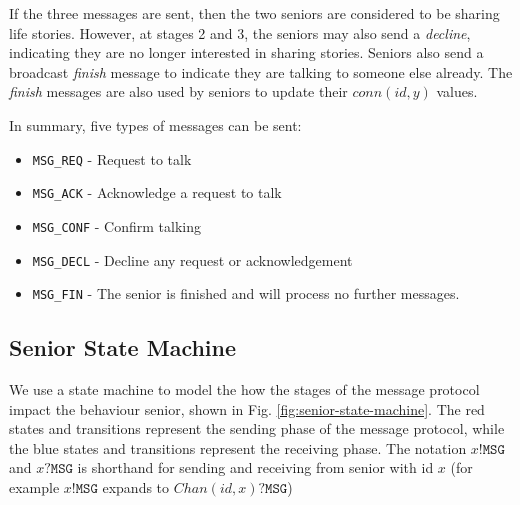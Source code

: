 \documentclass[12pt,a4paper]{scrartcl}
\begin{document}
If the three messages are sent, then the two seniors are considered to be sharing life stories.
However, at stages 2 and 3, the seniors may also send a \emph{decline}, indicating they are no longer interested in sharing stories.
Seniors also send a broadcast \emph{finish} message to indicate they are talking to someone else already.
The \emph{finish} messages are also used by seniors to update their $conn(id,y)$ values.

In summary, five types of messages can be sent:
\begin{itemize}
    \item \texttt{MSG\_REQ} - Request to talk
    \item \texttt{MSG\_ACK} - Acknowledge a request to talk
    \item \texttt{MSG\_CONF} - Confirm talking
    \item \texttt{MSG\_DECL} - Decline any request or acknowledgement
    \item \texttt{MSG\_FIN} - The senior is finished and will process no further messages.
\end{itemize}

\subsection{Senior State Machine}
We use a state machine to model the how the stages of the message protocol impact the behaviour senior, shown in Fig. \ref{fig:senior-state-machine}.
The red states and transitions represent the sending phase of the message protocol, while the blue states and transitions represent the receiving phase.
The notation $x!\texttt{MSG}$ and $x?\texttt{MSG}$ is shorthand for sending and receiving from senior with id $x$ (for example $x!\texttt{MSG}$ expands to $Chan(id,x)?\texttt{MSG}$)
\end{document}
